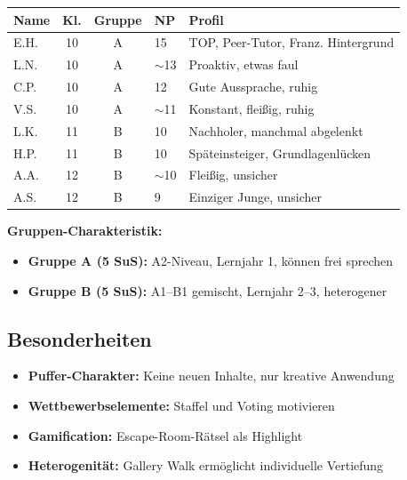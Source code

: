 \documentclass[11pt,a4paper]{article}
\begin{document}
\begin{tabular}{|l|c|c|l|p{5cm}|}
\hline
\textbf{Name} & \textbf{Kl.} & \textbf{Gruppe} & \textbf{NP} & \textbf{Profil} \\
\hline
\textcolor{gruppeA}{E.H.} & 10 & \textcolor{gruppeA}{A} & 15 & TOP, Peer-Tutor, Franz. Hintergrund \\
\hline
\textcolor{gruppeA}{L.N.} & 10 & \textcolor{gruppeA}{A} & $\sim$13 & Proaktiv, etwas faul \\
\hline
\textcolor{gruppeA}{C.P.} & 10 & \textcolor{gruppeA}{A} & 12 & Gute Aussprache, ruhig \\
\hline
\textcolor{gruppeA}{V.S.} & 10 & \textcolor{gruppeA}{A} & $\sim$11 & Konstant, fleißig, ruhig \\
\hline
\textcolor{gruppeB}{L.K.} & 11 & \textcolor{gruppeB}{B} & 10 & Nachholer, manchmal abgelenkt \\
\hline
\textcolor{gruppeB}{H.P.} & 11 & \textcolor{gruppeB}{B} & 10 & Späteinsteiger, Grundlagenlücken \\
\hline
\textcolor{gruppeB}{A.A.} & 12 & \textcolor{gruppeB}{B} & $\sim$10 & Fleißig, unsicher \\
\hline
\textcolor{gruppeB}{A.S.} & 12 & \textcolor{gruppeB}{B} & 9 & Einziger Junge, unsicher \\
\hline
\end{tabular}

\vspace{1em}

\textbf{Gruppen-Charakteristik:}
\begin{itemize}
    \item \textcolor{gruppeA}{\textbf{Gruppe A (5 SuS):}} A2-Niveau, Lernjahr 1, können frei sprechen
    \item \textcolor{gruppeB}{\textbf{Gruppe B (5 SuS):}} A1--B1 gemischt, Lernjahr 2--3, heterogener
\end{itemize}

\subsection{Besonderheiten}
\begin{itemize}
    \item \textbf{Puffer-Charakter:} Keine neuen Inhalte, nur kreative Anwendung
    \item \textbf{Wettbewerbselemente:} Staffel und Voting motivieren
    \item \textbf{Gamification:} Escape-Room-Rätsel als Highlight
    \item \textbf{Heterogenität:} Gallery Walk ermöglicht individuelle Vertiefung
\end{itemize}
\end{document}
